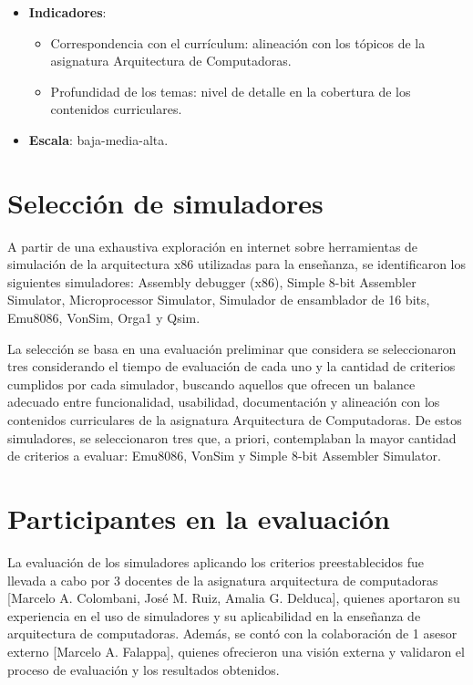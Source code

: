 \documentclass[12pt,twoside]{templates/unerthesis}
\providecommand{\tightlist}{%
  \setlength{\itemsep}{0pt}\setlength{\parskip}{0pt}}
\begin{document}
\begin{itemize}
  \begin{itemize}
  \tightlist
  \item
    \textbf{Indicadores}:

    \begin{itemize}
    \tightlist
    \item
      Correspondencia con el currículum: alineación con los tópicos de la asignatura Arquitectura de Computadoras.
    \item
      Profundidad de los temas: nivel de detalle en la cobertura de los contenidos curriculares.
    \end{itemize}
  \item
    \textbf{Escala}: baja-media-alta.
  \end{itemize}
\end{itemize}

\hypertarget{selecciuxf3n-de-simuladores}{%
\section{Selección de simuladores}\label{selecciuxf3n-de-simuladores}}

A partir de una exhaustiva exploración en internet sobre herramientas de simulación de la arquitectura x86 utilizadas para la enseñanza, se identificaron los siguientes simuladores: Assembly debugger (x86), Simple 8-bit Assembler Simulator, Microprocessor Simulator, Simulador de ensamblador de 16 bits, Emu8086, VonSim, Orga1 y Qsim.

La selección se basa en una evaluación preliminar que considera se seleccionaron tres considerando el tiempo de evaluación de cada uno y la cantidad de criterios cumplidos por cada simulador, buscando aquellos que ofrecen un balance adecuado entre funcionalidad, usabilidad, documentación y alineación con los contenidos curriculares de la asignatura Arquitectura de Computadoras. De estos simuladores, se seleccionaron tres que, a priori, contemplaban la mayor cantidad de criterios a evaluar: Emu8086, VonSim y Simple 8-bit Assembler Simulator.

\hypertarget{participantes-en-la-evaluaciuxf3n}{%
\section{Participantes en la evaluación}\label{participantes-en-la-evaluaciuxf3n}}

La evaluación de los simuladores aplicando los criterios preestablecidos fue llevada a cabo por 3 docentes de la asignatura arquitectura de computadoras {[}Marcelo A. Colombani, José M. Ruiz, Amalia G. Delduca{]}, quienes aportaron su experiencia en el uso de simuladores y su aplicabilidad en la enseñanza de arquitectura de computadoras. Además, se contó con la colaboración de 1 asesor externo {[}Marcelo A. Falappa{]}, quienes ofrecieron una visión externa y validaron el proceso de evaluación y los resultados obtenidos.
\end{document}
